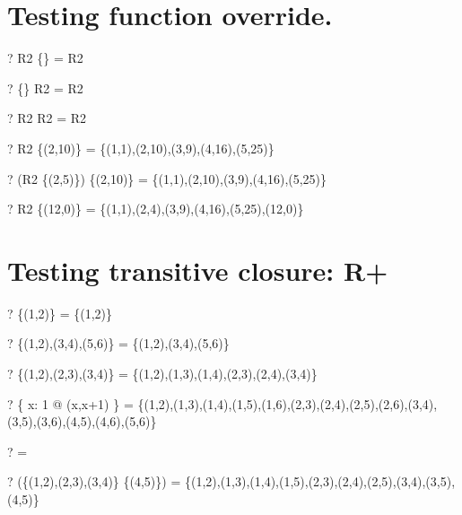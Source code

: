 \documentclass{article}
\newcommand{\negate}{-}
\begin{document}


\section{Testing function override.}
\begin{zed} \vdash? R2 \oplus \{\} = R2 \end{zed}
\begin{zed} \vdash? \{\} \oplus R2 = R2 \end{zed}
\begin{zed} \vdash? R2 \oplus R2   = R2 \end{zed}
\begin{zed} \vdash? R2 \oplus \{(2,10)\} = \{(1,1),(2,10),(3,9),(4,16),(5,25)\} \end{zed}
\begin{zed} \vdash? (R2 \cup \{(2,5)\}) \oplus \{(2,10)\} = \{(1,1),(2,10),(3,9),(4,16),(5,25)\} \end{zed}
\begin{zed} \vdash? R2 \oplus \{(12,0)\} = \{(1,1),(2,4),(3,9),(4,16),(5,25),(12,0)\} \end{zed}


\section{Testing transitive closure: R+}
\begin{zed} \vdash? \{(1,2)\} \plus = \{(1,2)\} \end{zed}
\begin{zed} \vdash? \{(1,2),(3,4),(5,6)\} \plus = \{(1,2),(3,4),(5,6)\} \end{zed}
\begin{zed} \vdash? \{(1,2),(2,3),(3,4)\} \plus = \{(1,2),(1,3),(1,4),(2,3),(2,4),(3,4)\} \end{zed}
\begin{zed} \vdash? \{ x: 1  @ (x,x+1) \} \plus = \{(1,2),(1,3),(1,4),(1,5),(1,6),(2,3),(2,4),(2,5),(2,6),(3,4),(3,5),(3,6),(4,5),(4,6),(5,6)\} \end{zed}
\begin{zed} \vdash? \emptyset \plus = \emptyset \end{zed}
\begin{zed} \vdash? (\{(1,2),(2,3),(3,4)\} \cup \{(4,5)\}) \plus = \{(1,2),(1,3),(1,4),(1,5),(2,3),(2,4),(2,5),(3,4),(3,5),(4,5)\} \end{zed}
\end{document}
